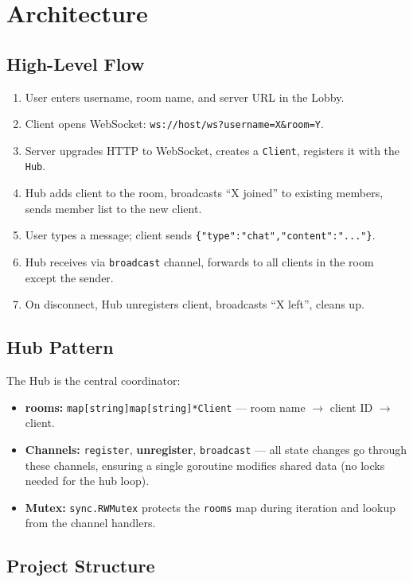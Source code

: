 \documentclass[11pt,a4paper]{article}
\begin{document}
\section{Architecture}

\subsection{High-Level Flow}

\begin{enumerate}
    \item User enters username, room name, and server URL in the Lobby.
    \item Client opens WebSocket: \texttt{ws://host/ws?username=X\&room=Y}.
    \item Server upgrades HTTP to WebSocket, creates a \texttt{Client}, registers it with the \texttt{Hub}.
    \item Hub adds client to the room, broadcasts ``X joined'' to existing members, sends member list to the new client.
    \item User types a message; client sends \texttt{\{"type":"chat","content":"..."\}}.
    \item Hub receives via \texttt{broadcast} channel, forwards to all clients in the room except the sender.
    \item On disconnect, Hub unregisters client, broadcasts ``X left'', cleans up.
\end{enumerate}

\subsection{Hub Pattern}

The Hub is the central coordinator:
\begin{itemize}
    \item \textbf{rooms:} \texttt{map[string]map[string]*Client} — room name $\to$ client ID $\to$ client.
    \item \textbf{Channels:} \texttt{register}, \textbf{unregister}, \texttt{broadcast} — all state changes go through these channels, ensuring a single goroutine modifies shared data (no locks needed for the hub loop).
    \item \textbf{Mutex:} \texttt{sync.RWMutex} protects the \texttt{rooms} map during iteration and lookup from the channel handlers.
\end{itemize}

\subsection{Project Structure}
\end{document}
